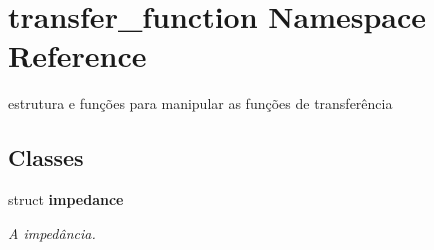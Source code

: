 \section{transfer\_\-function Namespace Reference}
\label{namespacetransfer__function}
estrutura e funções para manipular as funções de transferência  


\subsection*{Classes}
\begin{CompactItemize}
\item 
struct {\bf impedance}
\begin{CompactList}\small\item\em A impedância. \item\end{CompactList}\end{CompactItemize}
